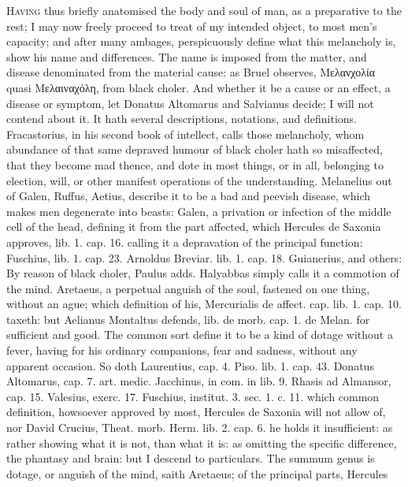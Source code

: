 {\lettrine{H}{aving} thus briefly anatomised the body and soul of man, as a
preparative to the rest; I may now freely proceed to treat of my
intended object, to most men's capacity; and after many ambages,
perspicuously define what this melancholy is, show his name and
differences. The name is imposed from the matter, and disease
denominated from the material cause: as Bruel observes, \textgreek{Μελανχολία
\textlatin{quasi} \textgreek{Μελαιναχόλη}, from black choler. And whether it be a cause or an
effect, a disease or symptom, let Donatus Altomarus and Salvianus
decide; I will not contend about it. It hath several descriptions,
notations, and definitions. Fracastorius, in his second book of
intellect, calls those melancholy, whom abundance of that same depraved
humour of black choler hath so misaffected, that they become mad
thence, and dote in most things, or in all, belonging to election,
will, or other manifest operations of the understanding. 
Melanelius out of Galen, Ruffus, Aetius, describe it to be a bad and
peevish disease, which makes men degenerate into beasts: Galen, a
privation or infection of the middle cell of the head, \etc{} defining it
from the part affected, which Hercules de Saxonia approves, lib.
1. cap. 16. calling it a depravation of the principal function:
Fuschius, lib. 1. cap. 23. Arnoldus Breviar. lib. 1. cap. 18.
Guianerius, and others: By reason of black choler, Paulus adds.
Halyabbas simply calls it a commotion of the mind. Aretaeus, a
perpetual anguish of the soul, fastened on one thing, without an ague;
which definition of his, Mercurialis de affect. cap. lib. 1. cap. 10.
taxeth: but Aelianus Montaltus defends, lib. de morb. cap. 1. de Melan.
for sufficient and good. The common sort define it to be a kind of
dotage without a fever, having for his ordinary companions, fear and
sadness, without any apparent occasion. So doth Laurentius, cap. 4.
Piso. lib. 1. cap. 43. Donatus Altomarus, cap. 7. art. medic.
Jacchinus, in com. in lib. 9. Rhasis ad Almansor, cap. 15. Valesius,
exerc. 17. Fuschius, institut. 3. sec. 1. c. 11. \etc{} which common
definition, howsoever approved by most, Hercules de Saxonia will
not allow of, nor David Crucius, Theat. morb. Herm. lib. 2. cap. 6. he
holds it insufficient: as rather showing what it is not, than
what it is: as omitting the specific difference, the phantasy and
brain: but I descend to particulars. The summum genus is dotage, or
anguish of the mind, saith Aretaeus; of the principal parts, Hercules
}}
